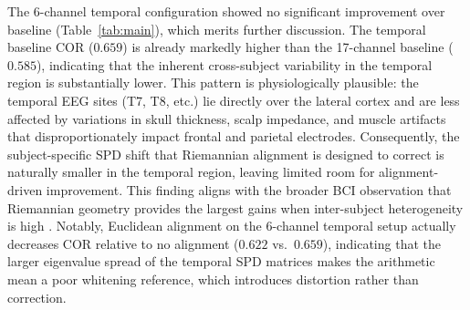 \documentclass[journal,twoside,web]{ieeecolor2}
\begin{document}
The 6-channel temporal configuration showed no significant improvement
over baseline (Table~\ref{tab:main}), which merits further discussion.
The temporal baseline COR ($0.659$) is already markedly higher than
the 17-channel baseline ($0.585$), indicating that the inherent
cross-subject variability in the temporal region is substantially
lower. This pattern is physiologically plausible: the temporal EEG
sites (T7, T8, etc.) lie directly over the lateral cortex and are less
affected by variations in skull thickness, scalp impedance, and muscle
artifacts that disproportionately impact frontal and parietal
electrodes. Consequently, the subject-specific SPD shift that Riemannian
alignment is designed to correct is naturally smaller in the temporal
region, leaving limited room for alignment-driven improvement. This
finding aligns with the broader BCI observation that Riemannian
geometry provides the largest gains when inter-subject heterogeneity
is high \cite{yger2017riemannian}. Notably, Euclidean alignment on the
6-channel temporal setup actually decreases COR relative to no
alignment ($0.622$ vs.\ $0.659$), indicating that the larger
eigenvalue spread of the temporal SPD matrices makes the arithmetic
mean a poor whitening reference, which introduces distortion rather
than correction.
\end{document}
